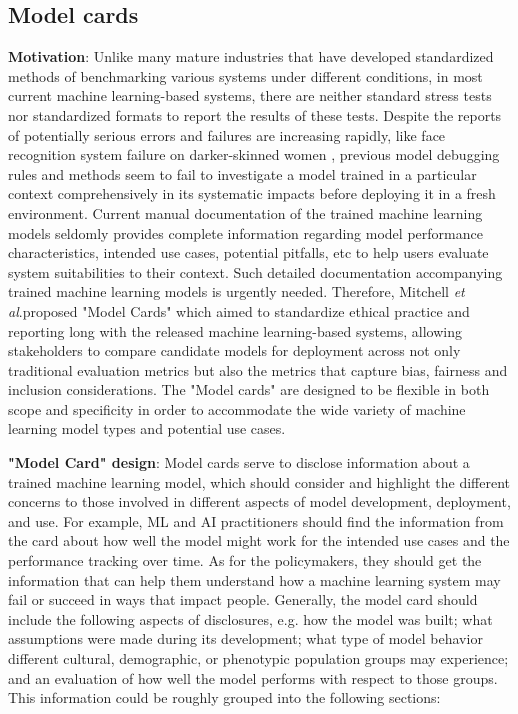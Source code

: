 \documentclass[conference]{IEEEtran}
\newcommand{\etal}{\textit{et al}.}
\begin{document}
\subsection{Model cards\cite{b1}}
\textbf{Motivation}: 
Unlike many mature industries that have developed standardized methods of benchmarking various systems under different conditions, 
in most current machine learning-based systems, there are neither standard stress tests nor standardized formats to report the results of these tests. 
Despite the reports of potentially serious errors and failures are increasing rapidly, like face recognition system failure on darker-skinned women \cite{b3}, 
previous model debugging rules and methods seem to fail to investigate a model trained in a particular context comprehensively in its systematic impacts before deploying it in a fresh environment. 
Current manual documentation of the trained machine learning models seldomly provides complete information regarding model performance characteristics, intended use cases, potential pitfalls, etc to help users evaluate system suitabilities to their context. 
Such detailed documentation accompanying trained machine learning models is urgently needed.
Therefore, Mitchell \etal proposed "Model Cards" which aimed to standardize ethical practice and reporting long with the released machine learning-based systems, 
allowing stakeholders to compare candidate models for deployment across not only traditional evaluation metrics but also the metrics that capture bias, fairness and inclusion considerations.
The "Model cards" are designed to be flexible in both scope
and specificity in order to accommodate the wide variety of machine learning model types and potential use cases.

\textbf{"Model Card" design}:
Model cards serve to disclose information about a trained machine learning model, which should consider and highlight the different concerns to those involved in different aspects of model development, deployment, and use. 
For example, ML and AI practitioners should find the information from the card about how well the model might work for the intended use cases and the performance tracking over time. As for the policymakers, they should get the information that can help them understand how a machine learning system may fail or succeed in ways that impact people.
Generally, the model card should include the following aspects of disclosures, e.g. how the model was built; 
what assumptions were made during its development; 
what type of model behavior different cultural, demographic, or phenotypic population groups may experience; and an evaluation of how well the model performs with respect to those groups.
This information could be roughly grouped into the following sections:
\end{document}
